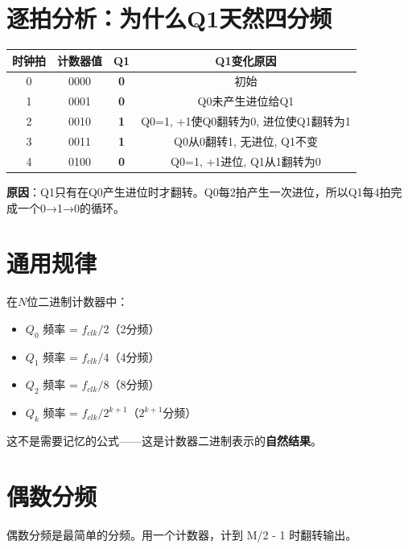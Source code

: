 \section{逐拍分析：为什么Q1天然四分频}

\begin{beatanalysis}[Q1为什么四分频]
\begin{center}
\begin{tabular}{|c|c|c|c|}
\hline
\textbf{时钟拍} & \textbf{计数器值} & \textbf{Q1} & \textbf{Q1变化原因} \\
\hline
0 & 0000 & \textbf{0} & 初始 \\
1 & 0001 & \textbf{0} & Q0未产生进位给Q1 \\
2 & 0010 & \textbf{1} & Q0=1, +1使Q0翻转为0, 进位使Q1翻转为1 \\
3 & 0011 & \textbf{1} & Q0从0翻转1, 无进位, Q1不变 \\
4 & 0100 & \textbf{0} & Q0=1, +1进位, Q1从1翻转为0 \\
\hline
\end{tabular}
\end{center}
\end{beatanalysis}

\textbf{原因}：Q1只有在Q0产生进位时才翻转。Q0每2拍产生一次进位，所以Q1每4拍完成一个0→1→0的循环。

\section{通用规律}

\begin{keypoint}[分频规律]
在$N$位二进制计数器中：
\begin{itemize}
  \item $Q_0$ 频率 = $f_{clk} / 2$（2分频）
  \item $Q_1$ 频率 = $f_{clk} / 4$（4分频）
  \item $Q_2$ 频率 = $f_{clk} / 8$（8分频）
  \item $Q_k$ 频率 = $f_{clk} / 2^{k+1}$（$2^{k+1}$分频）
\end{itemize}

这不是需要记忆的公式——这是计数器二进制表示的\textbf{自然结果}。
\end{keypoint}

\section{偶数分频}

偶数分频是最简单的分频。用一个计数器，计到 M/2 - 1 时翻转输出。


